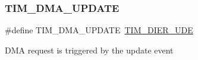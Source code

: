 \subsubsection{\texorpdfstring{TIM\_DMA\_UPDATE}{TIM\_DMA\_UPDATE}}
{\footnotesize\ttfamily \#define T\+I\+M\+\_\+\+D\+M\+A\+\_\+\+U\+P\+D\+A\+TE~\mbox{\hyperlink{group___peripheral___registers___bits___definition_gab9f47792b1c2f123464a2955f445c811}{T\+I\+M\+\_\+\+D\+I\+E\+R\+\_\+\+U\+DE}}}

D\+MA request is triggered by the update event 